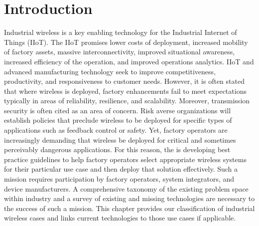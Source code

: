 	\section{Introduction} \label{sec:intro}
    Industrial wireless is a key enabling technology for the Industrial Internet of Things (IIoT).  The IIoT promises lower costs of deployment, increased mobility of factory assets, massive interconnectivity, improved situational awareness, increased efficiency of the operation, and improved operations analytics.  IIoT and advanced manufacturing technology seek to improve competitiveness, productivity, and responsiveness to customer needs. However, it is often stated that where wireless is deployed, factory enhancements fail to meet expectations typically in areas of reliability, resilience, and scalability. Moreover, transmission security is often cited as an area of concern. Risk averse organizations will establish policies that preclude wireless to be deployed for specific types of applications such as feedback control or safety. Yet, factory operators are increasingly demanding that wireless be deployed for critical and sometimes perceivably dangerous applications.  For this reason, the
\iftoggle{blindcopy}{(BLIND COPY - NAME REMOVED)}{National Institute of Standards and Technology (NIST)} 
is developing best practice guidelines to help factory operators select appropriate wireless systems for their particular use case and then deploy that solution effectively.  Such a mission requires participation by factory operators, system integrators, and device manufacturers. A comprehensive taxonomy of the existing problem space within industry and a survey of existing and missing technologies are necessary to the success of such a mission. This chapter provides our classification of industrial wireless cases and links current technologies to those use cases if applicable. 
    
